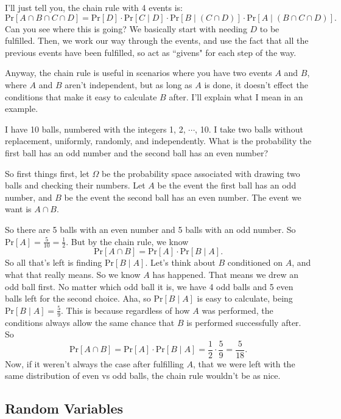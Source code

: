 \documentclass[11pt]{scrartcl}
\begin{document}
I'll just tell you, the chain rule with 4 events is: \[\text{Pr}[A \cap B \cap C \cap D] = \text{Pr}[D] \cdot \text{Pr}[C \mid D] \cdot \text{Pr}[B \mid (C \cap D)] \cdot \text{Pr}[A \mid (B \cap C \cap D)].\] Can you see where this is going? We basically start with needing $D$ to be fulfilled. Then, we work our way through the events, and use the fact that all the previous events have been fulfilled, so act as ``givens" for each step of the way.

Anyway, the chain rule is useful in scenarios where you have two events $A$ and $B$, where $A$ and $B$ aren't independent, but as long as $A$ is done, it doesn't effect the conditions that make it easy to calculate $B$ after. I'll explain what I mean in an example.

\begin{example}
I have 10 balls, numbered with the integers 1, 2, $\cdots$, 10. I take two balls without replacement, uniformly, randomly, and independently. What is the probability the first ball has an odd number and the second ball has an even number?
\end{example}

So first things first, let $\Omega$ be the probability space associated with drawing two balls and checking their numbers. Let $A$ be the event the first ball has an odd number, and $B$ be the event the second ball has an even number. The event we want is $A \cap B$.

So there are 5 balls with an even number and 5 balls with an odd number. So $\text{Pr}[A] = \frac{5}{10} = \frac{1}{2}$. But by the chain rule, we know \[\text{Pr}[A \cap B] = \text{Pr}[A] \cdot \text{Pr}[B \mid A].\] So all that's left is finding $\text{Pr}[B \mid A]$. Let's think about $B$ conditioned on $A$, and what that really means. So we know $A$ has happened. That means we drew an odd ball first. No matter which odd ball it is, we have 4 odd balls and 5 even balls left for the second choice. Aha, so $\text{Pr}[B \mid A]$ is easy to calculate, being $\text{Pr}[B \mid A] = \frac{5}{9}$. This is because regardless of how $A$ was performed, the conditions always allow the same chance that $B$ is performed successfully after. So \[\text{Pr}[A \cap B] = \text{Pr}[A] \cdot \text{Pr}[B \mid A] = \frac{1}{2} \cdot \frac{5}{9} = \frac{5}{18}.\] Now, if it weren't always the case after fulfilling $A$, that we were left with the same distribution of even vs odd balls, the chain rule wouldn't be as nice.

\subsection{Random Variables}
\end{document}
